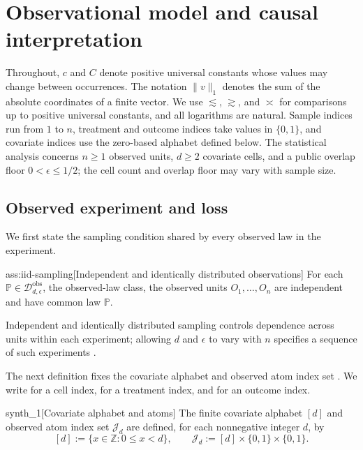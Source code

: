 \section{Observational model and causal interpretation}

Throughout, \(c\) and \(C\) denote positive universal constants whose values may change between occurrences. The notation \(\|v\|_1\) denotes the sum of the absolute coordinates of a finite vector. We use \(\lesssim\), \(\gtrsim\), and \(\asymp\) for comparisons up to positive universal constants, and all logarithms are natural. Sample indices run from \(1\) to \(n\), treatment and outcome indices take values in \(\{0,1\}\), and covariate indices use the zero-based alphabet defined below. The statistical analysis concerns \(n\ge1\) observed units, \(d\ge2\) covariate cells, and a public overlap floor \(0<\epsilon\le1/2\); the cell count and overlap floor may vary with sample size.

\subsection{Observed experiment and loss}

We first state the sampling condition shared by every observed law in the experiment.

\begin{assumptionv}{ass:iid-sampling}[Independent and identically distributed observations]
For each \(\mathbb P\in\mathcal D_{d,\epsilon}^{\mathrm{obs}}\), the observed-law class, the observed units \(O_1,\ldots,O_n\) are independent and have common law \(\mathbb P\).
\end{assumptionv}

Independent and identically distributed sampling controls dependence across units within each experiment; allowing \(d\) and \(\epsilon\) to vary with \(n\) specifies a sequence of such experiments \citep{ZengBalakrishnanHanKennedy2024Discrete}.

The next definition fixes the covariate alphabet  and observed atom index set . We write  for a cell index,  for a treatment index, and  for an outcome index.

\begin{definitionv}{synth_1}[Covariate alphabet and atoms]
The finite covariate alphabet \([d]\) and observed atom index set \(\mathcal J_d\) are defined, for each nonnegative integer \(d\), by
\[
[d] := \{x\in\mathbb Z : 0\le x<d\},
\qquad
\mathcal J_d := [d]\times\{0,1\}\times\{0,1\}.
\]
\end{definitionv}

